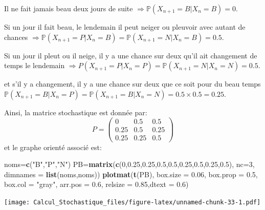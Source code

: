 \documentclass[
]{book}
\newenvironment{Shaded}{\begin{snugshade}}{\end{snugshade}}
\newcommand{\DataTypeTok}[1]{\textcolor[rgb]{0.13,0.29,0.53}{#1}}
\newcommand{\DecValTok}[1]{\textcolor[rgb]{0.00,0.00,0.81}{#1}}
\newcommand{\FloatTok}[1]{\textcolor[rgb]{0.00,0.00,0.81}{#1}}
\newcommand{\KeywordTok}[1]{\textcolor[rgb]{0.13,0.29,0.53}{\textbf{#1}}}
\newcommand{\NormalTok}[1]{#1}
\newcommand{\StringTok}[1]{\textcolor[rgb]{0.31,0.60,0.02}{#1}}
\theoremstyle{definition}
\theoremstyle{definition}
\theoremstyle{definition}
\theoremstyle{remark}
\begin{document}
Il ne fait jamais beau deux jours de suite \(\Longrightarrow \mathbb{P}(X_{n+1}=B|X_n=B)=0\).

Si un jour il fait beau, le lendemain il peut neiger ou pleuvoir avec autant de chances \(\Longrightarrow \mathbb{P}(X_{n+1}=P|X_n=B)=\mathbb{P}(X_{n+1}=N|X_n=B)=0.5\).

Si un jour il pleut ou il neige, il y a une chance sur deux qu'il ait changement de temps le lendemain \(\Longrightarrow P(X_{n+1}=P|X_n=P)=\mathbb{P}(X_{n+1}=N|X_n=N)=0.5\).

et s'il y a changement, il y a une chance sur deux que ce soit pour du beau temps \(\mathbb{P}(X_{n+1}=B|X_n=P)=\mathbb{P}(X_{n+1}=B|X_n=N)=0.5\times 0.5=0.25\).

Ainsi, la matrice stochastique est donnée par:
\[
  P=\left( 
  \begin{array}{ccc}
  0 & 0.5 & 0.5\\
  0.25 & 0.5 & 0.25\\
  0.25 & 0.25 & 0.5
  \end{array}
  \right)
  \]
et le graphe orienté associé est:

\begin{Shaded}
\begin{Highlighting}[]
\NormalTok{noms=}\KeywordTok{c}\NormalTok{(}\StringTok{"B"}\NormalTok{,}\StringTok{"P"}\NormalTok{,}\StringTok{"N"}\NormalTok{)}
\NormalTok{PB=}\KeywordTok{matrix}\NormalTok{(}\KeywordTok{c}\NormalTok{(}\DecValTok{0}\NormalTok{,}\FloatTok{0.25}\NormalTok{,}\FloatTok{0.25}\NormalTok{,}\FloatTok{0.5}\NormalTok{,}\FloatTok{0.5}\NormalTok{,}\FloatTok{0.25}\NormalTok{,}\FloatTok{0.5}\NormalTok{,}\FloatTok{0.25}\NormalTok{,}\FloatTok{0.5}\NormalTok{), }\DataTypeTok{nc=}\DecValTok{3}\NormalTok{,}
          \DataTypeTok{dimnames =} \KeywordTok{list}\NormalTok{(noms,noms))}
\KeywordTok{plotmat}\NormalTok{(}\KeywordTok{t}\NormalTok{(PB), }\DataTypeTok{box.size =} \FloatTok{0.06}\NormalTok{, }\DataTypeTok{box.prop =} \FloatTok{0.5}\NormalTok{, }\DataTypeTok{box.col =} \StringTok{"gray"}\NormalTok{, }
          \DataTypeTok{arr.pos =} \FloatTok{0.6}\NormalTok{, }\DataTypeTok{relsize =} \FloatTok{0.85}\NormalTok{,}\DataTypeTok{dtext =} \FloatTok{0.6}\NormalTok{)}
\end{Highlighting}
\end{Shaded}

\texttt{[image: Calcul\_Stochastique\_files/figure-latex/unnamed-chunk-33-1.pdf]}
\end{document}
